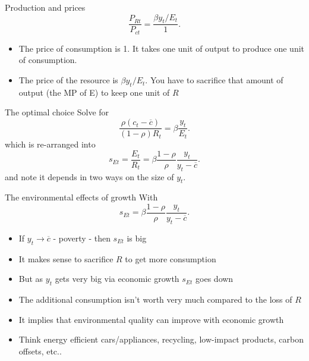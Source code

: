 \begin{frame}{Production and prices}
\begin{equation}
	\frac{P_{Rt}}{P_{ct}} = \frac{\beta y_t/E_t}{1}.\nonumber
\end{equation}
\begin{itemize}
	\item The price of consumption is 1. It takes one unit of output to produce one unit of consumption.
	\item The price of the resource is $\beta y_t/E_t$. You have to sacrifice that amount of output (the MP of E) to keep one unit of $R$
\end{itemize}
\end{frame}

\begin{frame}{The optimal choice}
Solve for
\begin{equation}
	\frac{\rho (c_t-\overline{c})}{(1-\rho)R_t} = \beta \frac{y_t}{E_t}. \nonumber
\end{equation}
which is re-arranged into
\begin{equation}
	s_{Et} = \frac{E_t}{R_t} = \beta \frac{1-\rho}{\rho} \frac{y_t}{y_t-\overline{c}}. \label{EQ_sE_choice}
\end{equation}
and note it depends in two ways on the size of $y_t$.
\end{frame}

\begin{frame}{The environmental effects of growth}
With
\begin{equation}
	s_{Et} = \beta \frac{1-\rho}{\rho} \frac{y_t}{y_t-\overline{c}}. \label{EQ_sE_choice}
\end{equation}
\begin{itemize}
	\item If $y_t \rightarrow \overline{c}$ - poverty - then $s_{Et}$ is big 
	\item It makes sense to sacrifice $R$ to get more consumption
	\item But as $y_t$ gets very big via economic growth $s_{Et}$ goes down
	\item The additional consumption isn't worth very much compared to the loss of $R$
	\item It implies that environmental quality can improve with economic growth
	\item Think energy efficient cars/appliances, recycling, low-impact products, carbon offsets, etc..
\end{itemize}
\end{frame}

